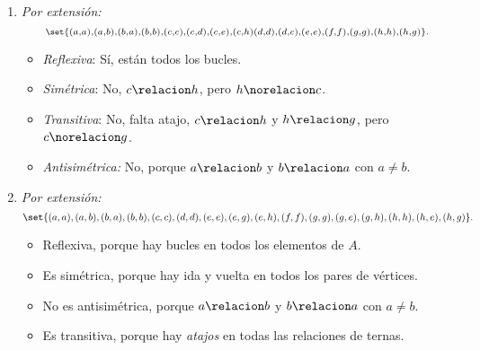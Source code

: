 \begin{enumerate}[label=\roman*)]
        \bigskip

  \item
        \begin{minipage}{0.3\textwidth}
          \diecinueveiii
        \end{minipage}
        \begin{minipage}{0.7\textwidth}
          \textit{Por extensión:}
          $$
            \scriptstyle
            \set{(a,a),(a,b),(b,a),(b,b),
              (c,c),(c,d),(c,e),(c,h)
              (d,d),(d,c), (e,e), (f,f), (g,g), (h,h),(h,g) }.
          $$
          \begin{itemize}
            \item \textit{Reflexiva}: Sí, están todos los bucles.
            \item \textit{Simétrica}: No, $c \relacion h$, pero $h \norelacion c$.
            \item \textit{Transitiva}: No, falta atajo, $c \relacion h$ y $h \relacion g$, pero $c \norelacion g$.
            \item \textit{Antisimétrica:} No, porque $a \relacion b$ y $b \relacion a$ con $a \neq b$.
          \end{itemize}
        \end{minipage}

        \bigskip

  \item
        \begin{minipage}{0.3\textwidth}
          \diecinueveiv
        \end{minipage}
        \begin{minipage}{0.7\textwidth}
          \textit{Por extensión:}
          {\tiny
            $$
              \set{(a,a),(a,b),(b,a),(b,b),(c,c),(d,d),
                (e,e),(e,g),(e,h),
                (f,f),
                (g,g),(g,e),(g,h),
                (h,h),(h,e),(h,g)
              }.
            $$
          }
          \begin{itemize}
            \item Reflexiva, porque hay bucles en todos los elementos de $A$.
            \item Es simétrica, porque hay ida y vuelta en todos los pares de vértices.
            \item No es antisimétrica, porque $a \relacion b$ y $b \relacion a$ con $a \neq b$.
            \item Es transitiva, porque hay \textit{atajos} en todas las relaciones de ternas.
          \end{itemize}
        \end{minipage}
\end{enumerate}

\begin{aportes}
  \item {}
\end{aportes}
